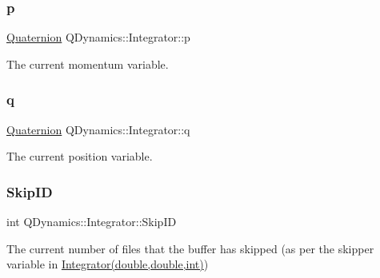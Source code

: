 \subsubsection{\texorpdfstring{p}{p}}
{\footnotesize\ttfamily \hyperlink{classQDynamics_1_1Quaternion}{Quaternion} Q\+Dynamics\+::\+Integrator\+::p\hspace{0.3cm}{\ttfamily [protected]}}



The current momentum variable. 

\mbox{\label{classQDynamics_1_1Integrator_a5929511da076c7f31749a6da713fcff6}} 
\subsubsection{\texorpdfstring{q}{q}}
{\footnotesize\ttfamily \hyperlink{classQDynamics_1_1Quaternion}{Quaternion} Q\+Dynamics\+::\+Integrator\+::q\hspace{0.3cm}{\ttfamily [protected]}}



The current position variable. 

\mbox{\label{classQDynamics_1_1Integrator_a95e110d6b14003db39f8a52180b97870}} 
\subsubsection{\texorpdfstring{Skip\+ID}{SkipID}}
{\footnotesize\ttfamily int Q\+Dynamics\+::\+Integrator\+::\+Skip\+ID\hspace{0.3cm}{\ttfamily [private]}}



The current number of files that the buffer has skipped (as per the skipper variable in \hyperlink{classQDynamics_1_1Integrator_aa469124cb408fadbaa540555dfabee33}{Integrator(double,double,int)}) 

\mbox{\label{classQDynamics_1_1Integrator_a409e18faeeefa5fb63f7bcce3eb0e381}} 
